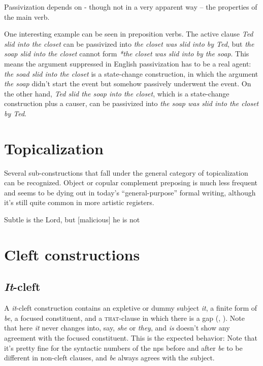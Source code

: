 \documentclass[UTF8, a4paper, oneside, scheme=plain, 12pt]{ctexbook}
\newcommand{\form}[1]{\emph{#1}}
\newcommand{\formcat}[1]{\textsc{#1}}
\begin{document}
Passivization depends on - though not in a very apparent way -- the properties of the main verb. 

One interesting example can be seen in preposition verbs. 
The active clause \form{Ted slid into the closet}
can be passivized into \form{the closet was slid into by Ted},
but \form{the soap slid into the closet}
cannot form  \form{*the closet was slid into by the soap}.
This means the argument suppressed in English passivization
has to be a real agent:
\form{the soad slid into the closet} is a state-change construction,
in which the argument \form{the soap} didn't start the event
but somehow passively underwent the event.
On the other hand, \form{Ted slid the soap into the closet},
which is a state-change construction plus a causer,
can be passivized into \form{the soap was slid into the closet by Ted}.

\section{Topicalization}\label{sec:simple-clause.information.topicalization}

Several sub-constructions that fall under the general category of topicalization can be recognized.
Object or copular complement preposing is much less frequent 
and seems to be dying out in today's ``general-purpose'' formal writing, 
although it's still quite common in more artistic registers. 

\begin{exe}
    \ex Subtle is the Lord, but [malicious] he is not
\end{exe}

\section{Cleft constructions}

\subsection{\form{It}-cleft}

A \form{it}-cleft construction 
contains an expletive or dummy subject \form{it},
a finite form of \form{be}, 
a focused constituent,
and a \formcat{that}-clause in which there is a gap
(, ).
Note that here \form{it} never changes into, say, \form{she} or \form{they},
and \form{is} doesn't show any agreement with the focused constituent.
This is the expected behavior: 
Note that it's pretty fine 
for the syntactic numbers of the \acs{np}s 
before and after \form{be} to be different
in non-cleft clauses, 
and \form{be} always agrees with the subject.
\end{document}
